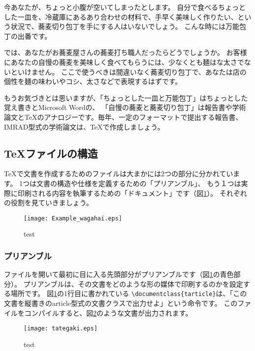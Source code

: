 \documentclass[TeXworkshop]{subfiles}
\begin{document}
今あなたが、ちょっと小腹が空いてしまったとします。
自分で食べるちょっとした一皿を、冷蔵庫にあるあり合わせの材料で、手早く美味しく作りたい、という状況で、蕎麦切り包丁を手にする人はいないでしょう。
こんな時には万能包丁の出番です。

では、あなたがお蕎麦屋さんの蕎麦打ち職人だったらどうでしょうか。
お客様にあなたの自慢の蕎麦を美味しく食べてもらうには、少なくとも麺はな太さでないといけません。
ここで使うべきは間違いなく蕎麦切り包丁で、あなたは店の個性を麺の味わいやコシ、太さなどで表現するはずです。

もうお気づきとは思いますが、「ちょっとした一皿と万能包丁」はちょっとした覚え書きとMicrosoft Wordの、
「自慢の蕎麦と蕎麦切り包丁」は報告書や学術論文と\TeX のアナロジーです。毎年、一定のフォーマットで提出する報告書、IMRAD型式の学術論文は、\TeX で作成しましょう。

\subsection{\TeX ファイルの構造}
\TeX で文書を作成するためのファイルは大まかには2つの部分に分かれています。
1つは文書の構造や仕様を定義するための「プリアンブル」、
もう１つは実際に印刷される内容を執筆するための「ドキュメント」です（図\ref{fig:example_wagahai}）。
それぞれの役割を見ていきましょう。

\begin{figure}[H]
\begin{center}
\texttt{[image: Example\_wagahai.eps]}
\caption{test}\label{fig:example_wagahai}
\end{center}
\end{figure}

\subsubsection{プリアンブル}
ファイルを開いて最初に目に入る先頭部分がプリアンブルです（図\ref{fig:example_wagahai}の青色部分）。
プリアンブルは、その文書をどのような形の媒体で印刷するのかを設定する場所です。
図\ref{fig:example_wagahai}の1行目に書かれている
\verb|\documentclass{tarticle}|は、「この文書を縦書きのarticle型式の文書クラスで出力せよ」という命令です。
このファイルをコンパイルすると、図\ref{fig:tategaki}のような文書が出力されます。

\begin{figure}[H]
\begin{center}
\texttt{[image: tategaki.eps]}
\caption{test}\label{fig:tategaki}
\end{center}
\end{figure}
\end{document}

